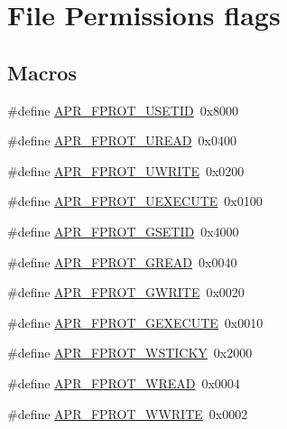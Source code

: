 \hypertarget{group__apr__file__permissions}{\section{File Permissions flags}
\label{group__apr__file__permissions}
}
\subsection*{Macros}
\begin{DoxyCompactItemize}
\item 
\#define \hyperlink{group__apr__file__permissions_ga67caebf5bbe4f3f4b6252a75e5ce066f}{A\-P\-R\-\_\-\-F\-P\-R\-O\-T\-\_\-\-U\-S\-E\-T\-I\-D}~0x8000
\item 
\#define \hyperlink{group__apr__file__permissions_gaab6c4c2e7b95f4345c248c27b3f1a655}{A\-P\-R\-\_\-\-F\-P\-R\-O\-T\-\_\-\-U\-R\-E\-A\-D}~0x0400
\item 
\#define \hyperlink{group__apr__file__permissions_ga50b985779b15fbfdae0758e98ffb92af}{A\-P\-R\-\_\-\-F\-P\-R\-O\-T\-\_\-\-U\-W\-R\-I\-T\-E}~0x0200
\item 
\#define \hyperlink{group__apr__file__permissions_ga156e1374a4ef30e745340d8c20b36d03}{A\-P\-R\-\_\-\-F\-P\-R\-O\-T\-\_\-\-U\-E\-X\-E\-C\-U\-T\-E}~0x0100
\item 
\#define \hyperlink{group__apr__file__permissions_ga5fcf6746afdd4e9b8be6ceab6892a3f5}{A\-P\-R\-\_\-\-F\-P\-R\-O\-T\-\_\-\-G\-S\-E\-T\-I\-D}~0x4000
\item 
\#define \hyperlink{group__apr__file__permissions_ga5ad9b67b8008db3ffc56c3c2a65aa192}{A\-P\-R\-\_\-\-F\-P\-R\-O\-T\-\_\-\-G\-R\-E\-A\-D}~0x0040
\item 
\#define \hyperlink{group__apr__file__permissions_gacecdc9f88b04c768150418688b786500}{A\-P\-R\-\_\-\-F\-P\-R\-O\-T\-\_\-\-G\-W\-R\-I\-T\-E}~0x0020
\item 
\#define \hyperlink{group__apr__file__permissions_gab627bef3f9ceb84bbf00906eaeb12184}{A\-P\-R\-\_\-\-F\-P\-R\-O\-T\-\_\-\-G\-E\-X\-E\-C\-U\-T\-E}~0x0010
\item 
\#define \hyperlink{group__apr__file__permissions_ga989dbea02f779a5f20a643d7e4ee9952}{A\-P\-R\-\_\-\-F\-P\-R\-O\-T\-\_\-\-W\-S\-T\-I\-C\-K\-Y}~0x2000
\item 
\#define \hyperlink{group__apr__file__permissions_ga194718630250b0f0dd4be38c86dac717}{A\-P\-R\-\_\-\-F\-P\-R\-O\-T\-\_\-\-W\-R\-E\-A\-D}~0x0004
\item 
\#define \hyperlink{group__apr__file__permissions_ga51692a9828f5b6288d89495378944260}{A\-P\-R\-\_\-\-F\-P\-R\-O\-T\-\_\-\-W\-W\-R\-I\-T\-E}~0x0002

\end{DoxyCompactItemize}
